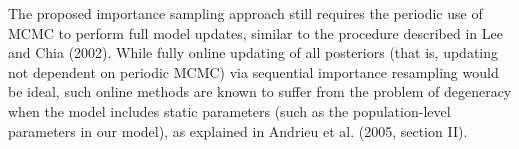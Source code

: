 \documentclass[12pt, letterpaper]{article}
\begin{document}
The proposed importance sampling approach still requires the periodic use of MCMC to perform full model updates, similar to the procedure described in Lee and Chia (2002)\nocite{Lee2002}. While fully online updating of all posteriors (that is, updating not dependent on periodic MCMC) via sequential importance resampling would be ideal, such online methods are known to suffer from the problem of degeneracy when the model includes static parameters (such as the population-level parameters in our model), as explained in Andrieu et al. (2005, section II)\nocite{Andrieu2005}.





\end{document}
